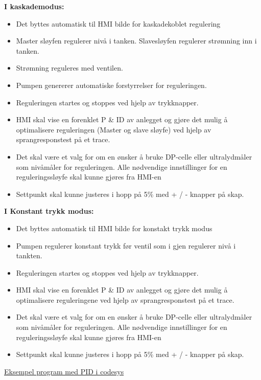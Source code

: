 \textbf{I kaskademodus:}

\begin{itemize}[noitemsep]
	\item Det byttes automatisk til HMI bilde for kaskadekoblet regulering 
	\item Master sløyfen regulerer nivå i tanken. Slavesløyfen regulerer strømning inn i tanken. 
	\item Strømning reguleres med ventilen. 
	\item Pumpen genererer automatiske forstyrrelser for reguleringen. 
	\item Reguleringen startes og stoppes ved hjelp av trykknapper.   
	\item HMI skal vise en forenklet P \& ID av anlegget og gjøre det mulig å optimalisere reguleringen (Master og slave sløyfe) ved hjelp av sprangresponstest på et trace.  
	\item Det skal være et valg for om en ønsker å bruke DP-celle eller ultralydmåler som nivåmåler for reguleringen. Alle nødvendige innstillinger for en reguleringssløyfe skal kunne gjøres fra HMI-en 
	\item Settpunkt skal kunne justeres i hopp på 5\% med + / - knapper på skap.  

\end{itemize}


\textbf{I Konstant trykk modus:}

\begin{itemize}[noitemsep]
	\item Det byttes automatisk til HMI bilde for konstakt trykk modus 
	\item Pumpen regulerer konstant trykk før ventil som  i gjen regulerer nivå i tankten. 
	\item Reguleringen startes og stoppes ved hjelp av trykknapper.   
	\item HMI skal vise en forenklet P \& ID av anlegget og gjøre det mulig å optimalisere reguleringene ved hjelp av sprangresponstest på et trace.  
	\item Det skal være et valg for om en ønsker å bruke DP-celle eller ultralydmåler som nivåmåler for reguleringen. Alle nødvendige innstillinger for en reguleringssløyfe skal kunne gjøres fra HMI-en 
	\item Settpunkt skal kunne justeres i hopp på 5\% med + / - knapper på skap.  

\end{itemize}

\href{https://rfka-my.sharepoint.com/:u:/g/personal/fred-olav_mosdal_skole_rogfk_no/EewzybzUnq5PscHy_uJUvUMB3ufsOB417mgUkhGlC8yQrg?e=rPkbpf}{Eksempel program med PID i codesys}

